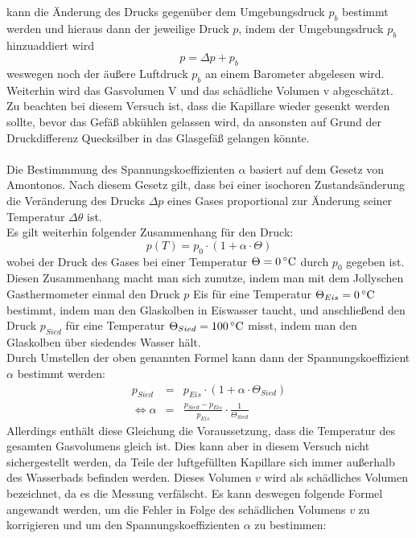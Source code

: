 \documentclass[a4paper,titlepage]{scrartcl}
\numberwithin{equation}{section}
\begin{document}
kann die Änderung des Drucks gegenüber dem Umgebungsdruck $p_b$ bestimmt werden und hieraus dann der jeweilige Druck $p$, indem der Umgebungsdruck $p_b$ hinzuaddiert wird
\begin{equation*}
p = \Delta p + p_b
\end{equation*}
weswegen noch der äußere Luftdruck $p_b$ an einem Barometer abgelesen wird.\\
Weiterhin wird das Gasvolumen V und das schädliche Volumen v abgeschätzt.\\
Zu beachten bei diesem Versuch ist, dass die Kapillare wieder gesenkt werden sollte, bevor das Gefäß abkühlen gelassen wird, da ansonsten auf Grund der Druckdifferenz Quecksilber in das Glasgefäß gelangen könnte.\\ \\
Die Bestimmmung des Spannungskoeffizienten $\alpha$ basiert auf dem Gesetz von Amontonos. Nach diesem Gesetz gilt, dass bei einer isochoren Zustandsänderung die Veränderung des Drucks $\Delta p$ eines Gases proportional zur Änderung seiner Temperatur $\Delta \theta$ ist.\\
Es gilt weiterhin folgender Zusammenhang für den Druck:
\begin{equation}
\label{eq:p}
p(T)=p_0 \cdot (1 + \alpha \cdot \Theta)
\end{equation}
wobei der Druck des Gases bei einer Temperatur $\Theta = \unit[0]{^\circ C}$ durch $p_0$ gegeben ist.
Diesen Zusammenhang macht man sich zunutze, indem man mit dem Jollyschen Gasthermometer einmal den Druck $p$ Eis für eine Temperatur $\Theta_{Eis} = \unit[0]{^\circ C}$ bestimmt, indem man den Glaskolben in Eiswasser taucht, und anschließend den Druck $p_{Sied}$ für eine Temperatur $\Theta_{Sied} = \unit[100]{^\circ C}$ misst, indem man den Glaskolben über siedendes Wasser hält.\\
Durch Umstellen der oben genannten Formel kann dann der Spannungskoeffizient $\alpha$ bestimmt werden:
\begin{eqnarray*}
p_{Sied}&=&p_{Eis} \cdot (1 + \alpha \cdot \Theta_{Sied})\\
\Leftrightarrow \alpha &=& \frac{p_{Sied}-p_{Eis}}{p_{Eis}} \cdot \frac{1}{\Theta_{Sied}}
\end{eqnarray*}
Allerdings enthält diese Gleichung die Voraussetzung, dass die Temperatur des gesamten Gasvolumens gleich ist. Dies kann aber in diesem Versuch nicht sichergestellt werden, da Teile der luftgefüllten Kapillare sich immer außerhalb des Wasserbads befinden werden. Dieses Volumen $v$ wird als schädliches Volumen bezeichnet, da es die Messung verfälscht. Es kann deswegen folgende Formel angewandt werden, um die Fehler in Folge des schädlichen Volumens $v$ zu korrigieren und um den Spannungskoeffizienten $\alpha$ zu bestimmen:
\end{document}
